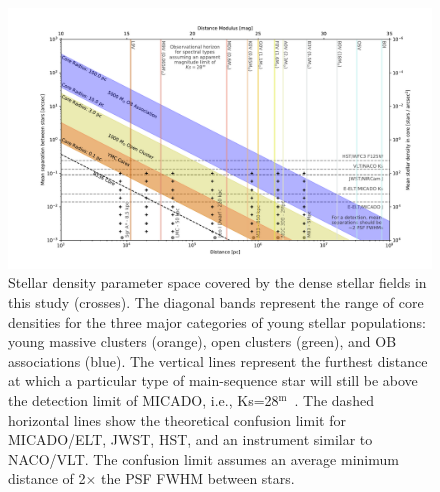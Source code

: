 \documentclass[referee]{aa}
\newcommand{\m}{$^\mathrm{m}$~}
\begin{document}
\begin{figure}

    \centering
    \includegraphics[width=\textwidth]{resolved_stellar_densities.pdf}

    \caption{Stellar density parameter space covered by the dense stellar fields in this study (crosses).
    The diagonal bands represent the range of core densities for the three major categories of young stellar populations: young massive clusters (orange), open clusters (green), and OB associations (blue).
    The vertical lines represent the furthest distance at which a particular type of main-sequence star will still be above the detection limit of MICADO, i.e., Ks=28\m.
    The dashed horizontal lines show the theoretical confusion limit for MICADO/ELT, JWST, HST, and an instrument similar to NACO/VLT.
    The confusion limit assumes an average minimum distance of 2$\times$ the PSF FWHM between stars.
    }

    \label{fig:resolved_stellar_densities}

\end{figure}
\end{document}
